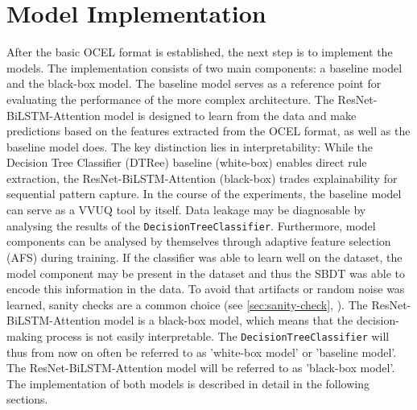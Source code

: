 \section{Model Implementation}

After the basic OCEL format is established, the next step is to implement the models. The implementation consists of two main components: a baseline model and the black-box model. The baseline model serves as a reference point for evaluating the performance of the more complex architecture. The ResNet-BiLSTM-Attention model is designed to learn from the data and make predictions based on the features extracted from the OCEL format, as well as the baseline model does. The key distinction lies in interpretability: While the Decision Tree Classifier (DTRee) baseline (white-box) enables direct rule extraction, the ResNet-BiLSTM-Attention (black-box) trades explainability for sequential pattern capture. In the course of the experiments, the baseline model can serve as a VVUQ tool by itself. Data leakage may be diagnosable by analysing the results of the \texttt{DecisionTreeClassifier}. Furthermore, model components can be analysed by themselves through adaptive feature selection (AFS) during training. If the classifier was able to learn well on the dataset, the model component may be present in the dataset and thus the SBDT was able to encode this information in the data. To avoid that artifacts or random noise was learned, sanity checks are a common choice (see \autoref{sec:sanity-check}, \autocite{adebayo2018sanity}). The ResNet-BiLSTM-Attention model is a black-box model, which means that the decision-making process is not easily interpretable. The \texttt{DecisionTreeClassifier} will thus from now on often be referred to as 'white-box model' or 'baseline model'. The ResNet-BiLSTM-Attention model will be referred to as 'black-box model'. The implementation of both models is described in detail in the following sections.

